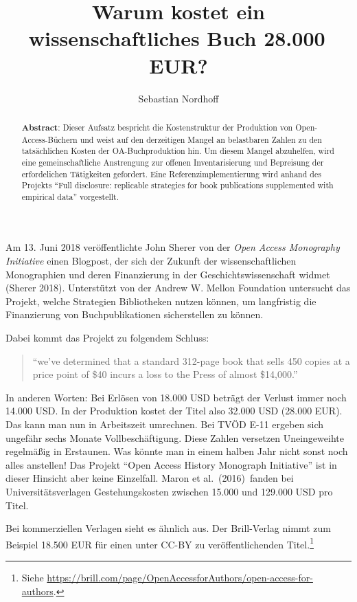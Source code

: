 \documentclass[a4paper,
fontsize=11pt,
oneside,
numbers=noperiodatend,
parskip=half-,
bibliography=totoc,
final
]{scrartcl}
\title{\LARGE{Warum kostet ein wissenschaftliches Buch 28.000\,EUR?}}%
\author{Sebastian Nordhoff} %
\date{}
\begin{document}
\maketitle
\thispagestyle{fancyplain} 

\begin{abstract}
\textbf{Abstract}: Dieser Aufsatz bespricht die Kostenstruktur der
Produktion von Open-Access-Büchern und weist auf den derzeitigen Mangel
an belastbaren Zahlen zu den tatsächlichen Kosten der OA-Buchproduktion
hin. Um diesem Mangel abzuhelfen, wird eine gemeinschaftliche
Anstrengung zur offenen Inventarisierung und Bepreisung der
erfordelichen Tätigkeiten gefordert. Eine Referenzimplementierung wird
anhand des Projekts ``Full disclosure: replicable strategies for book
publications supplemented with empirical data'' vorgestellt.
\end{abstract}

Am 13. Juni 2018 veröffentlichte John Sherer von der \emph{Open Access
Monography Initiative} einen Blogpost, der sich der Zukunft der
wissenschaftlichen Monographien und deren Finanzierung in der
Geschichtswissenschaft widmet (Sherer 2018). Unterstützt von der Andrew
W. Mellon Foundation untersucht das Projekt, welche Strategien
Bibliotheken nutzen können, um langfristig die Finanzierung von
Buchpublikationen sicherstellen zu können.

Dabei kommt das Projekt zu folgendem Schluss:

\begin{quote}
\enquote{we've determined that a standard 312-page book that sells 450
copies at a price point of \$40 incurs a loss to the Press of almost
\$14,000.}
\end{quote}

In anderen Worten: Bei Erlösen von 18.000 USD beträgt der Verlust immer
noch 14.000 USD. In der Produktion kostet der Titel also 32.000 USD
(28.000 EUR). Das kann man nun in Arbeitszeit umrechnen. Bei TVÖD E-11
ergeben sich ungefähr sechs Monate Vollbeschäftigung. Diese Zahlen
versetzen Uneingeweihte regelmäßig in Erstaunen. Was könnte man in einem
halben Jahr nicht sonst noch alles anstellen! Das Projekt \enquote{Open
Access History Monograph Initiative} ist in dieser Hinsicht aber keine
Einzelfall. Maron et al.~(2016)~fanden bei Universitätsverlagen
Gestehungskosten zwischen 15.000 und 129.000 USD pro Titel.

Bei kommerziellen Verlagen sieht es ähnlich aus. Der Brill-Verlag nimmt
zum Beispiel 18.500 EUR für einen unter CC-BY zu veröffentlichenden
Titel.\footnote{Siehe
  \url{https://brill.com/page/OpenAccessforAuthors/open-access-for-authors}.}
\end{document}
